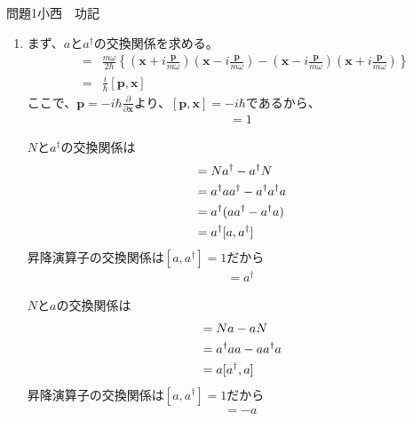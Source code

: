 \documentclass[fleqn]{jbook}
\begin{document}
\begin{answer}{問題1}{小西　功記}
\begin{enumerate}


\item
まず、$aとa^\dag$の交換関係を求める。
\begin{eqnarray}
[a,a^\dag]&=&\frac{m\omega}{2\hbar}\left\{\left(\mathbf{x}+i\frac{\mathbf{p}}{m\omega}\right)\left(\mathbf{x}-i\frac{\mathbf{p}}{m\omega}\right)-\left(\mathbf{x}-i\frac{\mathbf{p}}{m\omega}\right)\left(\mathbf{x}+i\frac{\mathbf{p}}{m\omega}\right)\right\}\\
&=&\frac{i}{\hbar}[\mathbf{p},\mathbf{x}]
\end{eqnarray}
ここで、$\mathbf{p}=-i\hbar\displaystyle\frac{\partial}{\partial\mathbf{x}}$より、$[\mathbf{p},\mathbf{x}]=-i\hbar$であるから、
\begin{eqnarray}
[a,a^\dag]=1
\end{eqnarray}

$N$と$a^{\dag}$の交換関係は
\begin{align}
[N,a^{\dag}]&=Na^{\dag}-a^{\dag}N \notag \\
               &=a^{\dag}aa^{\dag}-a^{\dag}a^{\dag}a \notag \\
               &=a^{\dag}(aa^{\dag}-a^{\dag}a) \notag \\
	   &=a^{\dag}[a,a^{\dag}]
\end{align}
昇降演算子の交換関係は$[a,a^{\dag}]=1$だから
\begin{align}
[N,a^{\dag}]=a^{\dag}
\end{align}

$N$と$a$の交換関係は
\begin{align}
[N,a]&=Na-aN \notag \\
       &=a^{\dag}aa-aa^{\dag}a \notag \\
       &=a[a^{\dag},a]
\end{align}
昇降演算子の交換関係は$[a,a^{\dag}]=1$だから
\begin{align}
[N,a]=-a
\end{align}



\end{enumerate}
\end{answer}
\end{document}
